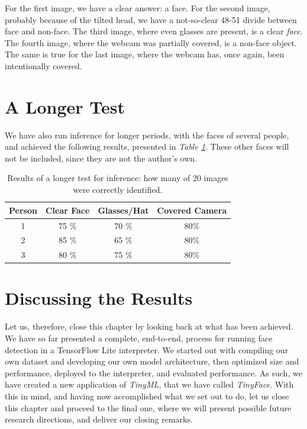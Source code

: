 For the first image, we have a clear answer: a face. For the second image, probably because of the tilted head, we have a not-so-clear 48-51 divide between face and non-face. The third image, where even glasses are present, is a clear \textit{face}. The fourth image, where the webcam was partially covered, is a non-face object. The same is true for the last image, where the webcam has, once again, been intentionally covered.

\section{A Longer Test}
We have also run inference for longer periods, with the faces of several people, and achieved the following results, presented in \textit{Table \ref{tab:inference_long_term}}. These other faces will not be included, since they are not the author's own.

\begin{table}
    \centering
    \begin{tabular}{|c|c|c|c|}
        \hline
        Person & Clear Face & Glasses/Hat & Covered Camera  \\ \hline
        1 & 75 \% & 70 \% & 80\% \\ \hline
        2 & 85 \% & 65 \% & 80\% \\ \hline
        3 & 80 \% & 75 \% & 80\% \\ \hline
    \end{tabular}
    \caption{Results of a longer test for inference: how many of 20 images were correctly identified.}
    \label{tab:inference_long_term}
\end{table}

\section{Discussing the Results}
Let us, therefore, close this chapter by looking back at what has been achieved. We have so far presented a complete, end-to-end, process for running face detection in a TensorFlow Lite interpreter. We started out with compiling our own dataset and developing our own model architecture, then optimized size and performance, deployed to the interpreter, and evaluated performance. As such, we have created a new application of \textit{TinyML}, that we have called \textit{TinyFace}. With this in mind, and having now accomplished what we set out to do, let us close this chapter and proceed to the final one, where we will present possible future research directions, and deliver our closing remarks.